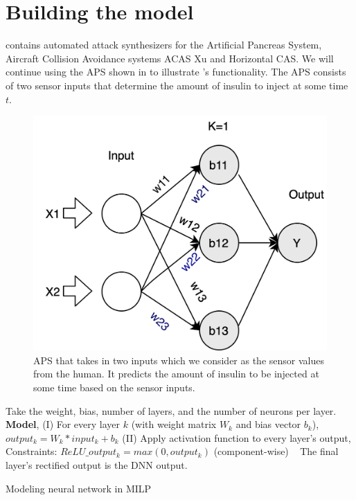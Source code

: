 \section{Building the model}
\label{section:attacks}

 \tool contains automated attack synthesizers for the Artificial Pancreas System, Aircraft Collision Avoidance systems ACAS Xu and Horizontal CAS. 
 We will continue using the \ac{APS} shown in \label{fig:toyaps} to illustrate \tool's functionality. 
The \ac{APS} consists of two sensor inputs that determine the amount of insulin to inject at some time $t$. 
\begin{figure}
	\centering
	\includegraphics[width=0.7\linewidth]{Images/ToyAPS}
	\caption[APS]{APS that takes in two inputs which we consider as the sensor values from the human. It predicts the amount of insulin to be injected at some time based on the sensor inputs.}
	\label{fig:toyaps}
\end{figure}


\begin{algorithm}
	Take the weight, bias, number of layers, and the number of neurons per layer. \\
	
	\textbf{Model}, \linebreak
	(I) For every layer $k$ (with weight matrix $W_k$ and bias vector $b_k$), $output_k = W_k * input_k + b_k$
	\linebreak
	(II) Apply activation function to every layer's output,
	\linebreak
	Constraints: $ReLU\_output_k = max(0, output_k)$ (component-wise) \
	\linebreak
	The final layer's rectified output is the DNN output.
	
	\caption{Modeling neural network in MILP}
	\label{algo:b}
\end{algorithm}


